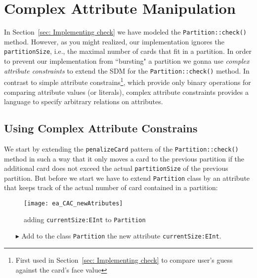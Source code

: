 \newpage
\section{Complex Attribute Manipulation}
\genHeader
In Section~\ref{sec: Implementing check} we have modeled the \texttt{Partition::check()} method.
However, as you might realized, our implementation ignores the \texttt{partitionSize}, i.e., the maximal number of cards that fit in a partition.
In order to prevent our implementation from ``bursting" a partition we gonna use \emph{complex attribute constraints} to extend the SDM for the \texttt{Partition::check()} method. 
In contrast to simple attribute constrains\footnote{First used in Section~\ref{sec: Implementing check} to compare user’s guess against the card's face value}, which provide only binary operations for comparing attribute values (or literals), complex attribute constraints provides a language to specify arbitrary relations on attributes.

\subsection{Using Complex Attribute Constrains}     
We start by extending the \texttt{penalizeCard} pattern of the \texttt{Partition::check()} method in such a way that it only moves a card to the previous partition if the additional card does not exceed the actual \texttt{partitionSize} of the previous partition. But before we start we have to extend \texttt{Partition} class by an attribute that keeps track of the actual number of card contained in a partition:

\begin{figure}[htbp]
\begin{center}
  \texttt{[image: ea\_CAC\_newAtributes]}
  \caption{adding \texttt{currentSize:EInt} to \texttt{Partition}}  
  \label{ea_CAC_newAtributes}
\end{center}
\end{figure}

\begin{itemize}    
\item[$\blacktriangleright$] Add to the class \texttt{Partition} the new attribute \texttt{currentSize:EInt}.
\end{itemize} 

